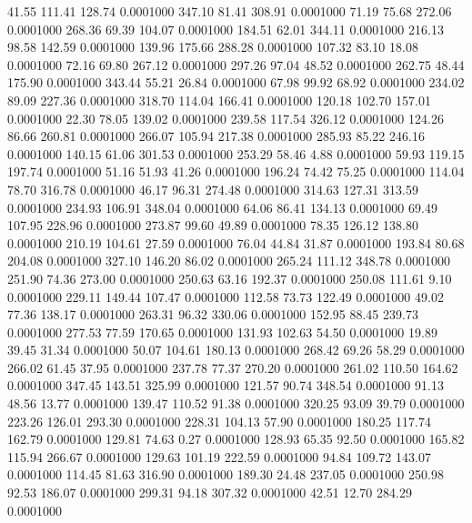   41.55  111.41  128.74   0.0001000
 347.10   81.41  308.91   0.0001000
  71.19   75.68  272.06   0.0001000
 268.36   69.39  104.07   0.0001000
 184.51   62.01  344.11   0.0001000
 216.13   98.58  142.59   0.0001000
 139.96  175.66  288.28   0.0001000
 107.32   83.10   18.08   0.0001000
  72.16   69.80  267.12   0.0001000
 297.26   97.04   48.52   0.0001000
 262.75   48.44  175.90   0.0001000
 343.44   55.21   26.84   0.0001000
  67.98   99.92   68.92   0.0001000
 234.02   89.09  227.36   0.0001000
 318.70  114.04  166.41   0.0001000
 120.18  102.70  157.01   0.0001000
  22.30   78.05  139.02   0.0001000
 239.58  117.54  326.12   0.0001000
 124.26   86.66  260.81   0.0001000
 266.07  105.94  217.38   0.0001000
 285.93   85.22  246.16   0.0001000
 140.15   61.06  301.53   0.0001000
 253.29   58.46    4.88   0.0001000
  59.93  119.15  197.74   0.0001000
  51.16   51.93   41.26   0.0001000
 196.24   74.42   75.25   0.0001000
 114.04   78.70  316.78   0.0001000
  46.17   96.31  274.48   0.0001000
 314.63  127.31  313.59   0.0001000
 234.93  106.91  348.04   0.0001000
  64.06   86.41  134.13   0.0001000
  69.49  107.95  228.96   0.0001000
 273.87   99.60   49.89   0.0001000
  78.35  126.12  138.80   0.0001000
 210.19  104.61   27.59   0.0001000
  76.04   44.84   31.87   0.0001000
 193.84   80.68  204.08   0.0001000
 327.10  146.20   86.02   0.0001000
 265.24  111.12  348.78   0.0001000
 251.90   74.36  273.00   0.0001000
 250.63   63.16  192.37   0.0001000
 250.08  111.61    9.10   0.0001000
 229.11  149.44  107.47   0.0001000
 112.58   73.73  122.49   0.0001000
  49.02   77.36  138.17   0.0001000
 263.31   96.32  330.06   0.0001000
 152.95   88.45  239.73   0.0001000
 277.53   77.59  170.65   0.0001000
 131.93  102.63   54.50   0.0001000
  19.89   39.45   31.34   0.0001000
  50.07  104.61  180.13   0.0001000
 268.42   69.26   58.29   0.0001000
 266.02   61.45   37.95   0.0001000
 237.78   77.37  270.20   0.0001000
 261.02  110.50  164.62   0.0001000
 347.45  143.51  325.99   0.0001000
 121.57   90.74  348.54   0.0001000
  91.13   48.56   13.77   0.0001000
 139.47  110.52   91.38   0.0001000
 320.25   93.09   39.79   0.0001000
 223.26  126.01  293.30   0.0001000
 228.31  104.13   57.90   0.0001000
 180.25  117.74  162.79   0.0001000
 129.81   74.63    0.27   0.0001000
 128.93   65.35   92.50   0.0001000
 165.82  115.94  266.67   0.0001000
 129.63  101.19  222.59   0.0001000
  94.84  109.72  143.07   0.0001000
 114.45   81.63  316.90   0.0001000
 189.30   24.48  237.05   0.0001000
 250.98   92.53  186.07   0.0001000
 299.31   94.18  307.32   0.0001000
  42.51   12.70  284.29   0.0001000
